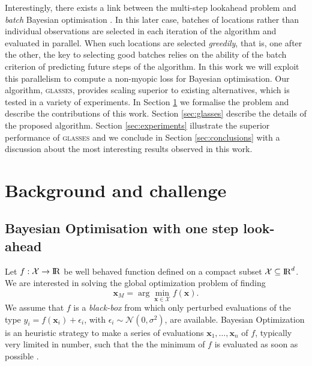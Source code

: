\documentclass[twoside]{article}
\def\bbbr{{\rm I\!R}}
\newcommand{\bx}{\textbf{x}}
\newcommand{\acr}[1]{\textsc{#1}\xspace}
\newcommand{\us}{\acr{glasses}}
\begin{document}
Interestingly, there exists a link between the multi-step lookahead problem and \emph{batch} Bayesian optimisation \citep{Ginsbourger2009,Azimi2011,Azimi2012}. In this later case, batches of locations rather than individual observations are selected in each iteration of the algorithm and evaluated in parallel. When such locations are selected \emph{greedily}, that is, one after the other, the key to selecting good batches relies on the ability of the batch criterion of predicting future steps of the algorithm. In this work we will exploit this parallelism to compute a non-myopic loss for Bayesian optimisation. Our algorithm, \us, provides scaling superior to existing alternatives, which is tested in a variety of experiments. In Section \ref{sec:background} we formalise the problem and describe the contributions of this work. Section \ref{sec:glasses} describe the details of the proposed algorithm. Section \ref{sec:experiments} illustrate the superior performance of \us and we conclude in Section \ref{sec:conclusions} with a discussion about the most interesting results observed in this work.


\section{Background and challenge}\label{sec:background}
\subsection{Bayesian Optimisation with one step look-ahead} %
\label{sec:bayesian_optimisation}


Let $f: {\mathcal X} \to \bbbr$ be well behaved function defined on a compact subset ${\mathcal X} \subseteq \bbbr^d$. We are interested in solving the global optimization problem of finding 
$$\bx_{M} = \arg \min_{\bx \in {\mathcal X}} f(\bx).$$ 
We assume that $f$ is a \emph{black-box} from which only perturbed evaluations of the type $y_i = f(\bx_i) + \epsilon_i$, with $\epsilon_i \sim\mathcal{N}(0,\sigma^2)$, are  available. Bayesian Optimization is an heuristic strategy to make a series of evaluations $\bx_1,\dots,\bx_n$ of $f$, typically very limited in number,  such that the the minimum of $f$ is evaluated as soon as possible \citep{Lizotte_2008,Jones_2001,Snoek*Larochelle*Adams_2012,Brochu*Cora*DeFreitas_2010}.
\end{document}
